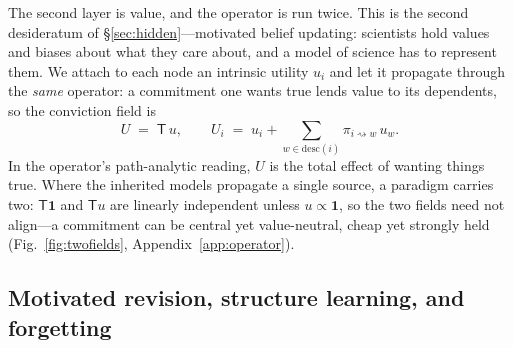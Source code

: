 \documentclass[runningheads]{llncs}
\newcommand{\desc}{\mathrm{desc}}
\newcommand{\rw}{\rightsquigarrow}
\newcommand{\Top}{\mathsf{T}}          %
\newcommand{\bone}{\mathbf{1}}         %
\begin{document}
The second layer is value, and the operator is run twice. This is the second desideratum of
\S\ref{sec:hidden}---motivated belief updating: scientists hold values and biases about what
they care about, and a model of science has to represent them. We attach to each node an
intrinsic utility $u_i$ and let it propagate
through the \emph{same} operator: a commitment one wants true lends value to its dependents, so the
conviction field is
\begin{equation}
U \;=\; \Top\,u,
\qquad
U_i \;=\; u_i+\!\!\sum_{w\in\desc(i)}\!\!\pi_{i\rw w}\,u_w .
\label{eq:U}
\end{equation}
In the operator's path-analytic reading, $U$ is the total effect of wanting things true. Where the
inherited models propagate a single source, a paradigm carries two: $\Top\bone$ and $\Top u$ are
linearly independent unless $u\propto\bone$, so the two fields need not align---a commitment can
be central yet value-neutral, cheap yet strongly held (Fig.~\ref{fig:twofields},
Appendix~\ref{app:operator}).

\subsection{Motivated revision, structure learning, and forgetting}
\label{sec:revision}
\end{document}
